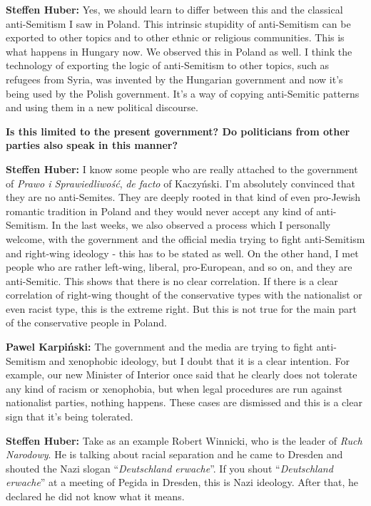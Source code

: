 \textbf{Steffen Huber:} Yes, we should learn to differ between this and the classical anti-Semitism I saw in Poland. This intrinsic stupidity of anti-Semitism can be exported to other topics and to other ethnic or religious communities. This is what happens in Hungary now. We observed this in Poland as well. I think the technology of exporting the logic of anti-Semitism to other topics, such as refugees from Syria, was invented by the Hungarian government and now it's being used by the Polish government. It’s a way of copying anti-Semitic patterns and using them in a new political discourse. 

\textbf{Is this limited to the present government? Do politicians from other parties also speak in this manner?} 

\textbf{Steffen Huber:} I know some people who are really attached to the government of \textit{Prawo i Sprawiedliwość}, \textit{de facto} of Kaczyński. I'm absolutely convinced that they are no anti-Semites. They are deeply rooted in that kind of even pro-Jewish romantic tradition in Poland and they would never accept any kind of anti-Semitism. In the last weeks, we also observed a process which I personally welcome, with the government and the official media trying to fight anti-Semitism and right-wing ideology - this has to be stated as well. On the other hand, I met people who are rather left-wing, liberal, pro-European, and so on, and they are anti-Semitic. This shows that there is no clear correlation. If there is a clear correlation of right-wing thought of the conservative types with the nationalist or even racist type, this is the extreme right. But this is not true for the main part of the conservative people in Poland. \par
\textbf{Pawel Karpiński:} The government and the media are trying to fight anti-Semitism and xenophobic ideology, but I doubt that it is a clear intention. For example, our new Minister of Interior once said that he clearly does not tolerate any kind of racism or xenophobia, but when legal procedures are run against nationalist parties, nothing happens. These cases are dismissed and this is a clear sign that it’s being tolerated.\par
\textbf{Steffen Huber:} Take as an example Robert Winnicki, who is the leader of \textit{Ruch Narodowy}. He is talking about racial separation and he came to Dresden and shouted the Nazi slogan “\textit{Deutschland erwache}”. If you shout “\textit{Deutschland erwache}” at a meeting of Pegida in Dresden, this is Nazi ideology. After that, he declared he did not know what it means.  


